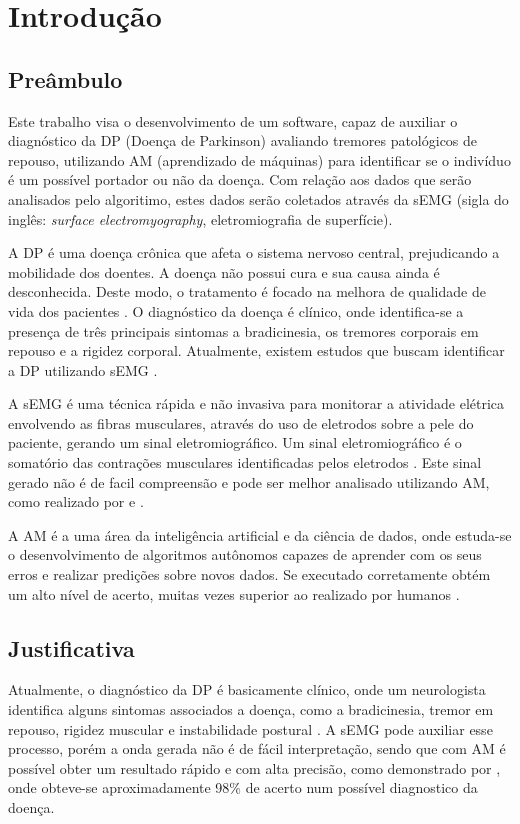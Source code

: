 \chapter[Introdução]{Introdução} 
\section{Preâmbulo} 
Este trabalho visa o desenvolvimento de um software, capaz de auxiliar o diagnóstico da DP (Doença de Parkinson) avaliando tremores patológicos de repouso, utilizando AM (aprendizado de máquinas) para identificar se o indivíduo é um possível portador ou não da doença. Com relação aos dados que serão analisados pelo algoritimo, estes dados serão coletados através da sEMG (sigla do inglês: \textit{surface electromyography}, eletromiografia de superfície).

A DP é uma doença crônica que afeta o sistema nervoso central, prejudicando a mobilidade dos doentes. A doença não possui cura e sua causa ainda é desconhecida. Deste modo, o tratamento é focado na melhora de qualidade de vida dos pacientes \cite{da2016aspectos}. O diagnóstico da doença é clínico, onde identifica-se a presença de três principais sintomas a bradicinesia, os tremores corporais em repouso e a rigidez corporal. Atualmente, existem estudos que buscam identificar a DP utilizando sEMG \cite{eftaxias2015detection}.

A sEMG é uma técnica rápida e não invasiva para monitorar a atividade elétrica envolvendo as fibras musculares, através do uso de eletrodos sobre a pele do paciente, gerando um sinal eletromiográfico. Um sinal eletromiográfico é o somatório das contrações musculares identificadas pelos eletrodos \cite{de2010eletromiografia}. Este sinal gerado não é de facil compreensão e pode ser melhor analisado utilizando AM, como realizado por  e . 

A AM é a uma área da inteligência artificial e da ciência de dados, onde estuda-se o desenvolvimento de algoritmos autônomos capazes de aprender com os seus erros e realizar predições sobre novos dados. Se executado corretamente obtém um alto nível de acerto, muitas vezes superior ao realizado por humanos \cite{Kohavi}.

\section{Justificativa} 
Atualmente, o diagnóstico da DP é basicamente clínico, onde um neurologista identifica alguns sintomas associados a doença, como a bradicinesia, tremor em repouso, rigidez muscular e instabilidade postural \cite{gago2014manual}. A sEMG pode auxiliar esse processo, porém a onda gerada não é de fácil interpretação, sendo que com AM é possível obter um resultado rápido e com alta precisão, como demonstrado por , onde obteve-se aproximadamente 98\% de acerto num possível diagnostico da doença. 

